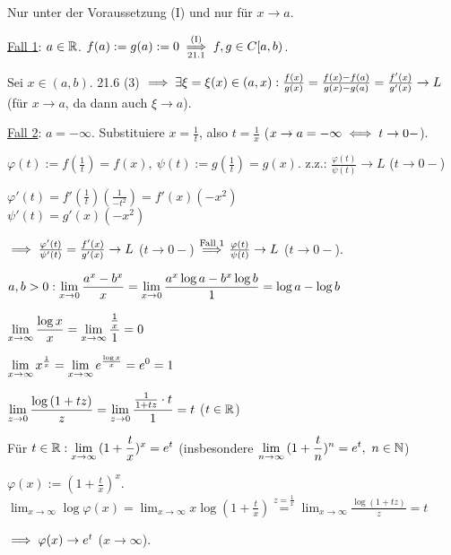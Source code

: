 \documentclass[a4paper,oneside,DIV15,BCOR12mm]{scrbook}
\begin{document}
\begin{beweis}
Nur unter der Voraussetzung (I) und nur für $x \to a$.

\underline{Fall 1}: $a \in \mathbb{R}$. $f(a) := g(a) := 0 \overset{\text{(I)}}{\underset{\text{21.1}}{\implies}} f,g \in C[a,b)$.

Sei $x \in (a,b)$. 21.6 (3) $\implies \exists \xi = \xi(x) \in (a,x): \frac{f(x)}{g(x)} = \frac{f(x)-f(a)}{g(x)-g(a)} = \frac{f'(x)}{g'(x)} \to L$ (für $x \to a$, da dann auch $\xi \to a$).

\underline{Fall 2}: $a = -\infty$. Substituiere $x = \frac{1}{t}$, also $t = \frac{1}{x}$ ($x \to a = -\infty \iff t \to 0-$).

$\varphi(t) := f(\frac{1}{t}) = f(x),\ \psi(t) := g(\frac{1}{t}) = g(x)$. z.z.: $\frac{\varphi(t)}{\psi(t)} \to L$ ($t \to 0-$)

$\varphi'(t) = f'(\frac{1}{t})(\frac{1}{-t^2}) = f'(x)(-x^2)$\\
$\psi'(t) = g'(x)(-x^2)$

$\implies \frac{\varphi'(t)}{\psi'(t)} = \frac{f'(x)}{g'(x)} \to L$ ($t \to 0-$) $\overset{\text{Fall 1}}{\implies} \frac{\varphi(t)}{\psi(t)} \to L$ ($t \to 0-$).
\end{beweis}

\begin{beispiele}
\item $a,b > 0: \displaystyle{\lim_{x \to 0}{\frac{a^x-b^x}{x}}} = \displaystyle{\lim_{x \to 0}{\frac{a^x\log{a} - b^x\log{b}}{1}}} = \log{a} - \log{b}$
\item $\displaystyle{\lim_{x \to \infty}{\frac{\log{x}}{x}}} = \displaystyle{\lim_{x \to \infty}{\frac{\frac{1}{x}}{1}}} = 0$
\item $\displaystyle{\lim_{x \to \infty}{x^{\frac{1}{x}}}} = \displaystyle{\lim_{x \to \infty}{e^{\frac{\log{x}}{x}}}} = e^0 = 1$
\item $\displaystyle{\lim_{z \to 0}{\frac{\log{(1+tz)}}{z}}} = \displaystyle{\lim_{z \to 0}{\frac{\frac{1}{1+tz} \cdot t}{1}}} = t$ ($t \in \mathbb{R}$)
\item Für $t \in \mathbb{R}: \displaystyle{\lim_{x \to \infty}{(1+\frac{t}{x})^x}} = e^t$ (insbesondere $\displaystyle{\lim_{n \to \infty}{(1+\frac{t}{n})^n}} = e^t,\ n \in \mathbb{N}$)
\begin{beweis}
$\varphi(x) := (1+\frac{t}{x})^x.$\\
$\lim_{x \to \infty}{\log{\varphi(x)}} = \lim_{x \to \infty}{x\log{(1+\frac{t}{x})}} \overset{z = \frac{1}{x}}{=} \lim_{x \to \infty}{\frac{\log{(1+tz)}}{z}} = t$

$\implies \varphi(x) \to e^t$ ($x \to \infty$).
\end{beweis}
\end{beispiele}
\end{document}
